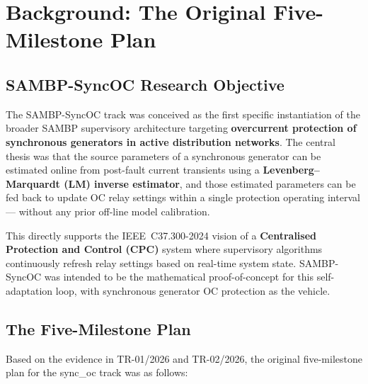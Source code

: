 \documentclass[12pt,a4paper]{article}
\begin{document}
\section{Background: The Original Five-Milestone Plan}
\label{sec:background}

\subsection{SAMBP-SyncOC Research Objective}
\label{sec:bg:objective}

The SAMBP-SyncOC track was conceived as the first specific instantiation of the
broader SAMBP supervisory architecture targeting \textbf{overcurrent protection of
synchronous generators in active distribution networks}.  The central thesis was
that the source parameters of a synchronous generator can be estimated online from
post-fault current transients using a \textbf{Levenberg--Marquardt (LM) inverse
estimator}, and those estimated parameters can be fed back to update OC relay
settings within a single protection operating interval --- without any prior
off-line model calibration.

This directly supports the IEEE~C37.300-2024 vision of a \textbf{Centralised
Protection and Control (CPC)} system where supervisory algorithms continuously
refresh relay settings based on real-time system state.  SAMBP-SyncOC was
intended to be the mathematical proof-of-concept for this self-adaptation loop,
with synchronous generator OC protection as the vehicle.

\subsection{The Five-Milestone Plan}
\label{sec:bg:plan}

Based on the evidence in TR-01/2026 and TR-02/2026, the original five-milestone
plan for the sync\_oc track was as follows:
\end{document}
